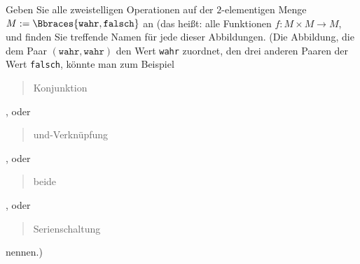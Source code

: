 
\begin{exercise}[16]

Geben Sie alle zweistelligen Operationen auf der $2$-elementigen Menge $M := \Bbraces{\texttt{wahr}, \texttt{falsch}}$ an (das heißt: alle Funktionen $f: M \times M \to M$, und finden Sie treffende Namen für jede dieser Abbildungen.
(Die Abbildung, die dem Paar $(\texttt{wahr}, \texttt{wahr})$ den Wert \texttt{wahr} zuordnet, den drei anderen Paaren der Wert \texttt{falsch}, könnte man zum Beispiel \blockquote{Konjunktion}, oder \blockquote{und-Verknüpfung}, oder \blockquote{beide}, oder \blockquote{Serienschaltung} nennen.)

\end{exercise}


